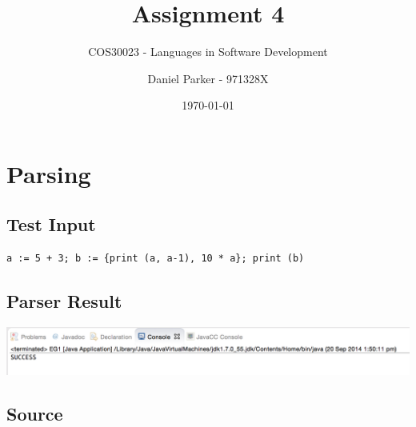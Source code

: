 \documentclass[11pt, numbers=endperiod, parskip=half]{scrartcl}
\title{Assignment 4}
\subtitle{COS30023 - Languages in Software Development}
\author{Daniel Parker - 971328X}
\date{\today}
\begin{document}

\maketitle
\section{Parsing}
\subsection{Test Input}
\begin{verbatim}
a := 5 + 3; b := {print (a, a-1), 10 * a}; print (b)
\end{verbatim}
\subsection{Parser Result}
\centering
\includegraphics[width=\linewidth]{success.png}

\begin{landscape}
\section{Source}
\inputminted{java}{StraightLine/src/StraightLine.jj}
\end{landscape}
\end{document}

